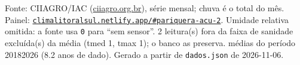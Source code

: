 \documentclass[10pt,a4paper]{article}
\begin{document}
\vspace{1pt}
{\tiny\color{cinza}
Fonte: CIIAGRO/IAC (\href{http://ciiagro.org.br}{ciiagro.org.br}), série mensal;
chuva é o total do mês. Painel:
\href{https://climalitoralsul.netlify.app/\#pariquera-acu-2}%
{\texttt{climalitoralsul.netlify.app/\#pariquera-acu-2}}.
Umidade relativa omitida: a fonte usa \texttt{0} para ``sem sensor''.  2 leitura(s) fora da faixa de sanidade excluída(s) da média (tmed 1, tmax 1); o banco as preserva.
médias do período 2018\textendash{}2026 (8.2 anos de dado).
Gerado a partir de \texttt{dados.json} de 2026-11-06.}
\end{document}
